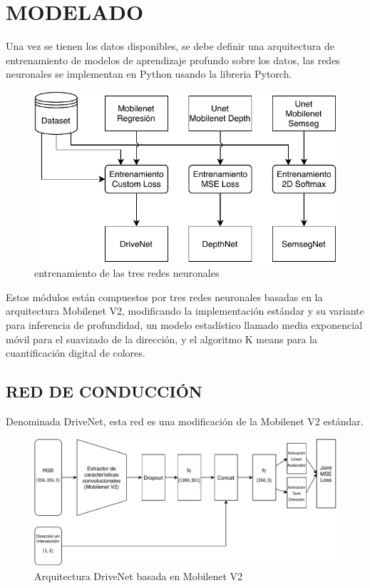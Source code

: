 \section{MODELADO}
	Una vez se tienen los datos disponibles, se debe definir una arquitectura de entrenamiento de modelos de aprendizaje profundo sobre los datos, las redes neuronales se implementan en Python usando la libreria Pytorch.
	
	\begin{figure}[H]
		\centering
		\includegraphics[scale=0.8]{imagenes/arquitectura_entrenamiento}
		\caption[Entrenamiento de tres redes neuronales]{entrenamiento de las tres redes neuronales}
		\label{training}
	\end{figure}
	
	Estos módulos están compuestos por tres redes neuronales basadas en la arquitectura Mobilenet V2, modificando la implementación estándar y su variante para inferencia de profundidad, un modelo estadístico llamado media exponencial móvil para el suavizado de la dirección, y el algoritmo K means para la cuantificación digital de colores.
	
	\subsection{RED DE CONDUCCIÓN}
		Denominada DriveNet, esta red es una modificación de la Mobilenet V2 estándar.
		
		\begin{figure}[H]
			\centering
			\includegraphics[scale=0.7]{imagenes/drivenet}
			\caption[Arquitectura DriveNet basada en Mobilenet V2]{Arquitectura DriveNet basada en Mobilenet V2}
			\label{drivenet}
		\end{figure}
	
